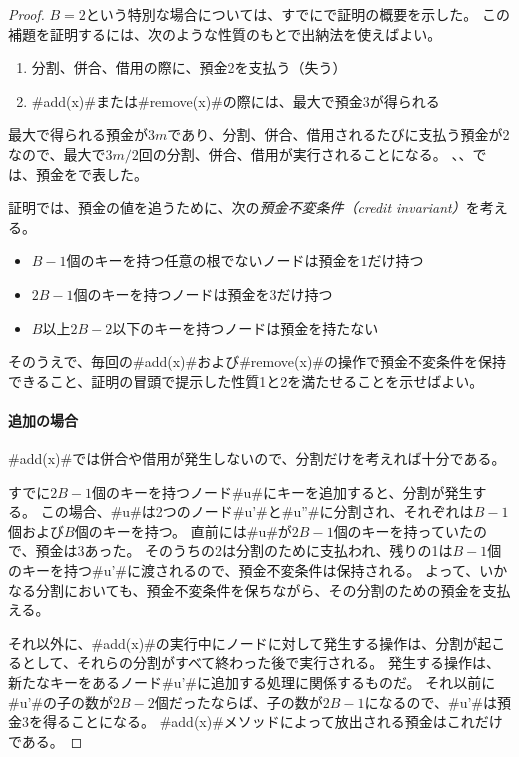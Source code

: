 \begin{proof}
   $B=2$という特別な場合については、すでにで証明の概要を示した。
   この補題を証明するには、次のような性質のもとで出納法を使えばよい。
  \begin{enumerate}
    \item 分割、併合、借用の際に、預金2を支払う（失う）
    \item #add(x)#または#remove(x)#の際には、最大で預金3が得られる
  \end{enumerate}
  最大で得られる預金が$3m$であり、分割、併合、借用されるたびに支払う預金が2なので、最大で$3m/2$回の分割、併合、借用が実行されることになる。
  、、では、預金を\cent{}で表した。

  証明では、預金の値を追うために、次の\emph{預金不変条件（credit invariant）}を考える。%
  \begin{itemize}
  \item $B-1$個のキーを持つ任意の根でないノードは預金を1だけ持つ
  \item $2B-1$個のキーを持つノードは預金を3だけ持つ
  \item $B$以上$2B-2$以下のキーを持つノードは預金を持たない
  \end{itemize}
  そのうえで、毎回の#add(x)#および#remove(x)#の操作で預金不変条件を保持できること、証明の冒頭で提示した性質1と2を満たせることを示せばよい。

  \paragraph{追加の場合}
  #add(x)#では併合や借用が発生しないので、分割だけを考えれば十分である。

  すでに$2B-1$個のキーを持つノード#u#にキーを追加すると、分割が発生する。
  この場合、#u#は2つのノード#u'#と#u''#に分割され、それぞれは$B-1$個および$B$個のキーを持つ。
  直前には#u#が$2B-1$個のキーを持っていたので、預金は3あった。
  そのうちの2は分割のために支払われ、残りの1は$B-1$個のキーを持つ#u'#に渡されるので、預金不変条件は保持される。
  よって、いかなる分割においても、預金不変条件を保ちながら、その分割のための預金を支払える。

  それ以外に、#add(x)#の実行中にノードに対して発生する操作は、分割が起こるとして、それらの分割がすべて終わった後で実行される。
  発生する操作は、新たなキーをあるノード#u'#に追加する処理に関係するものだ。
  それ以前に#u'#の子の数が$2B-2$個だったならば、子の数が$2B-1$になるので、#u'#は預金3を得ることになる。
  #add(x)#メソッドによって放出される預金はこれだけである。


\end{proof}

